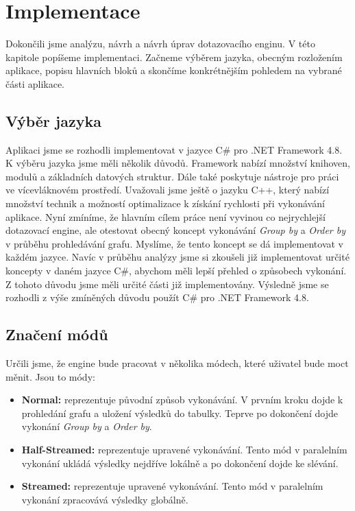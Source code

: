 \chapter{Implementace}
\label{impl}
   
Dokončili jsme analýzu, návrh a návrh úprav dotazovacího enginu.
V této kapitole popíšeme implementaci.
Začneme výběrem jazyka, obecným rozložením aplikace, popisu hlavních bloků a skončíme konkrétnějším pohledem na vybrané části aplikace.

\section{Výběr jazyka}

Aplikaci jsme se rozhodli implementovat v jazyce C\# pro .NET Framework 4.8.
K výběru jazyka jsme měli několik důvodů.
Framework nabízí množství knihoven, modulů a základních datových struktur.
Dále také poskytuje nástroje pro práci ve vícevláknovém prostředí.
Uvažovali jsme ještě o jazyku C++, který nabízí množství technik a možností optimalizace k získání rychlosti při vykonávání aplikace. 
Nyní zmíníme, že hlavním cílem práce není vyvinou co nejrychlejší dotazovací engine, ale otestovat obecný koncept vykonávání \textit{Group by} a \textit{Order by} v průběhu prohledávání grafu.
Myslíme, že tento koncept se dá implementovat v každém jazyce.
Navíc v průběhu analýzy jsme si zkoušeli již implementovat určité koncepty v daném jazyce C\#, abychom měli lepší přehled o způsobech vykonání.
Z tohoto důvodu jsme měli určité části již implementovány.
Výsledně jsme se rozhodli z výše zmíněných důvodu použít C\# pro .NET Framework 4.8.

\section{Značení módů} \label{impl.engine.modes}

Určili jsme, že engine bude pracovat v několika módech, které uživatel bude moct měnit.
Jsou to módy:

\begin{itemize}

\item \textbf{Normal:} reprezentuje původní způsob vykonávání.
V prvním kroku dojde k prohledání grafu a uložení výsledků do tabulky.
Teprve po dokončení dojde vykonání \textit{Group by} a \textit{Order by}.

\item \textbf{Half-Streamed:} reprezentuje upravené vykonávání. 
Tento mód v paralelním vykonání ukládá výsledky nejdříve lokálně a po dokončení dojde ke slévání.

\item \textbf{Streamed:} reprezentuje upravené vykonávání. 
Tento mód v paralelním vykonání zpracovává výsledky globálně.
\end{itemize}

